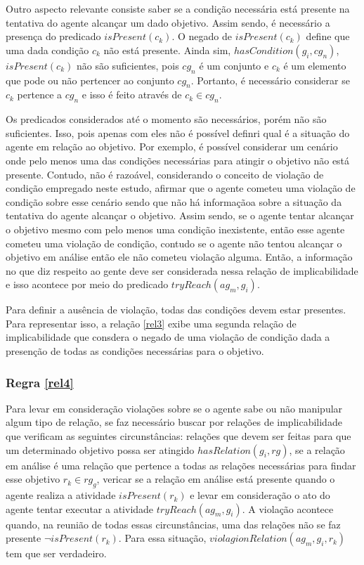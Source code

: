 \documentclass[12pt]{article}
\begin{document}
Outro aspecto relevante consiste saber se a condição necessária está presente na tentativa do agente alcançar um dado objetivo. Assim sendo, é necessário a presença do predicado $isPresent(c_k)$. O negado de $isPresent(c_k)$ define que uma dada condição $c_k$ não está presente. Ainda sim, $hasCondition(g_i,cg_n)$, $isPresent(c_k)$ não são suficientes, pois $cg_n$ é um conjunto e $c_k$ é um elemento que pode ou não pertencer ao conjunto $cg_n$. Portanto, é necessário considerar se $c_k$ pertence a $cg_n$ e isso é feito através de $c_k \in cg_n$. 

Os predicados considerados até o momento são necessários, porém não são suficientes. Isso, pois apenas com eles não é possível definri qual é a situação do agente em relação ao objetivo. Por exemplo, é possível considerar um cenário onde pelo menos uma das condições necessárias para atingir o objetivo não está presente. Contudo, não é razoável, considerando o conceito de violação de condição empregado neste estudo, afirmar que o agente cometeu uma violação de condição sobre esse cenário sendo que não há informaçãoa sobre a situação da tentativa do agente alcançar o objetivo. Assim sendo, se o agente tentar alcançar o objetivo mesmo com pelo menos uma condição inexistente, então esse agente cometeu uma violação de condição, contudo se o agente não tentou alcançar o objetivo em análise então ele não cometeu violação alguma. Então, a informação no que diz respeito ao gente deve ser considerada nessa relação de implicabilidade e isso acontece por meio do predicado $tryReach(ag_m,g_i)$.

Para definir a ausência de violação, todas das condições devem estar presentes. Para representar isso, a relação \ref{rel3} exibe uma segunda relação de implicabilidade que consdera o negado de uma violação de condição dada a presenção de todas as condições necessárias para o objetivo. 

 
\subsubsection{Regra \ref{rel4}}
Para levar em consideração violações sobre se o agente sabe ou não manipular algum tipo de relação, se faz necessário buscar por relações de implicabilidade que verificam as seguintes circunstâncias: relações que devem ser feitas para que um determinado objetivo possa ser atingido $hasRelation(g_i,rg)$, se a relação em análise é uma relação que pertence a todas as relações necessárias para findar esse objetivo $r_k \in rg_g$, vericar se a relação em análise está presente quando o agente realiza a atividade $isPresent(r_k)$ e levar em consideração o ato do agente tentar executar a atividade $tryReach(ag_m,g_i)$. A violação acontece quando, na reunião de todas essas circunstâncias, uma das relações não se faz presente $\neg isPresent(r_k)$. Para essa situação, $violagionRelation(ag_m,g_i,r_k)$ tem que ser verdadeiro. 
\end{document}
